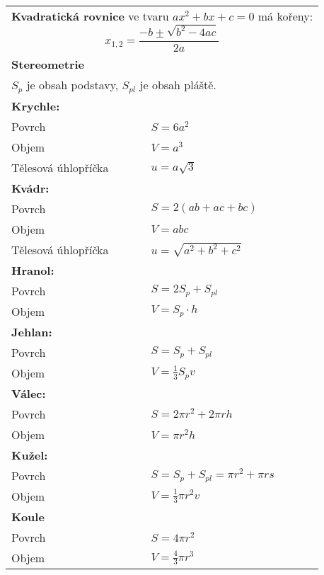 \documentclass[10pt,a4paper]{article}
\newcommand{\nazv}[1]{{\large \textbf{\textsf{#1}}}}
\begin{document}
\begin{tabular}{ll}
\multicolumn{2}{p{8cm}}{\nazv{Kvadratická rovnice} ve tvaru $ax^2+bx+c=0$ má kořeny:
$$x_{1,2}=\frac{-b\pm\sqrt{b^2-4ac}}{2a}$$}\\
\multicolumn{2}{l}{\nazv{Stereometrie}}\\
\multicolumn{2}{l}{$S_p$ je obsah podstavy, $S_{pl}$ je obsah pláště.}\\
\multicolumn{2}{l}{\textbf{Krychle:}}\\
Povrch&$S=6a^2$\\
Objem& $V=a^3$\\
Tělesová úhlopříčka&$u=a\sqrt{3}$\\
\multicolumn{2}{l}{\textbf{Kvádr:}}\\
Povrch&$S=2(ab+ac+bc) $\\
Objem&$V=abc$\\
Tělesová úhlopříčka&$u=\sqrt{a^2+b^2+c^2}$\\
\multicolumn{2}{l}{\textbf{Hranol:}}\\
Povrch&$S=2S_p + S_{pl}$\\
Objem&$V=S_p\cdot h$\\
\multicolumn{2}{l}{\textbf{Jehlan:}}\\
Povrch&$S=S_p + S_{pl}$\\
Objem&$V=\frac{1}{3}S_p v$\\
\multicolumn{2}{l}{\textbf{Válec:}}\\
Povrch&$S=2\pi r^2 + 2\pi r h$\\
Objem&$V=\pi r^2 h$\\
\multicolumn{2}{l}{\textbf{Kužel:}}\\
Povrch&$S=S_p + S_{pl}=\pi r^2 + \pi r s$\\
Objem&$V=\frac{1}{3}\pi r^2 v$\\
\textbf{Koule}&\\
Povrch& $S=4\pi r^2$\\
Objem& $V=\frac{4}{3}\pi r^3$%
\end{tabular}
\end{document}
